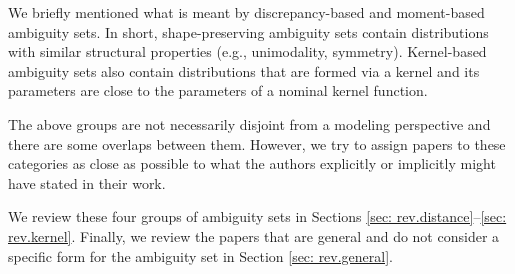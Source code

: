 \documentclass[final,onefignum,onetabnum]{class}
\newcommand{\dro}{DRO}
\begin{document}
We briefly mentioned what is meant by discrepancy-based  and  moment-based  ambiguity sets. In short, shape-preserving  ambiguity sets contain distributions with similar structural properties (e.g., unimodality, symmetry). Kernel-based ambiguity sets  also contain distributions that are formed via a kernel and its parameters are close to the parameters of a nominal kernel function. 
\begin{comment}
\begin{itemize}
	\item Moment-based ambiguity sets contain distributions whose moments satisfy certain properties, 
	\item discrepancy-based ambiguity sets contain distributions that are close to a nominal distribution with respect to some discrepancy measure, 
	\item Shape-preserving-based ambiguity sets contain distributions with similar structural properties (e.g., unimodality, symmetry),
	\item Kernel-based ambiguity also sets contain distributions that are formed via a kernel and its parameters are close to the parameters of a nominal kernel function. 
\end{itemize}
\end{comment}
The above groups are not necessarily disjoint from a modeling perspective and there are some overlaps between them.  %
However, we  try to assign papers to these categories as close as possible to  what the authors explicitly or implicitly might have stated in their work. %


We review  these four groups of ambiguity sets in Sections \ref{sec: rev.distance}--\ref{sec: rev.kernel}. 
Finally, we review the papers that are general and do not consider a specific form for the ambiguity set in Section \ref{sec: rev.general}. 
\end{document}
